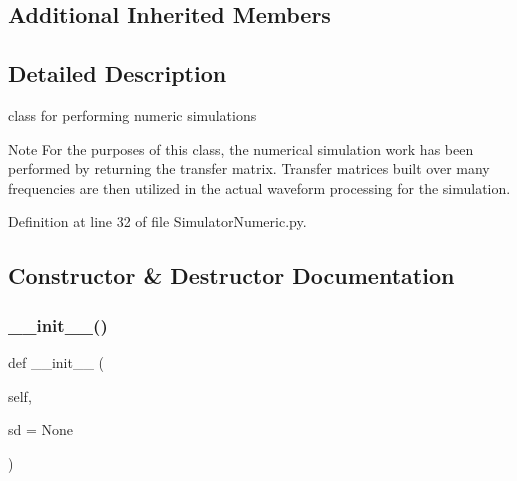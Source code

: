 \subsection*{Additional Inherited Members}


\subsection{Detailed Description}
class for performing numeric simulations 

\begin{DoxyNote}{Note}
For the purposes of this class, the numerical simulation work has been performed by returning the transfer matrix. Transfer matrices built over many frequencies are then utilized in the actual waveform processing for the simulation. 
\end{DoxyNote}


Definition at line 32 of file Simulator\+Numeric.\+py.



\subsection{Constructor \& Destructor Documentation}
\mbox{\label{classSignalIntegrity_1_1SystemDescriptions_1_1SimulatorNumeric_1_1SimulatorNumeric_a2fa2ae61a4511a760e2d2047ec07eb05}} 
\subsubsection{\texorpdfstring{\+\_\+\+\_\+init\+\_\+\+\_\+()}{\_\_init\_\_()}}
{\footnotesize\ttfamily def \+\_\+\+\_\+init\+\_\+\+\_\+ (\begin{DoxyParamCaption}\item[{}]{self,  }\item[{}]{sd = {\ttfamily None} }\end{DoxyParamCaption})}



